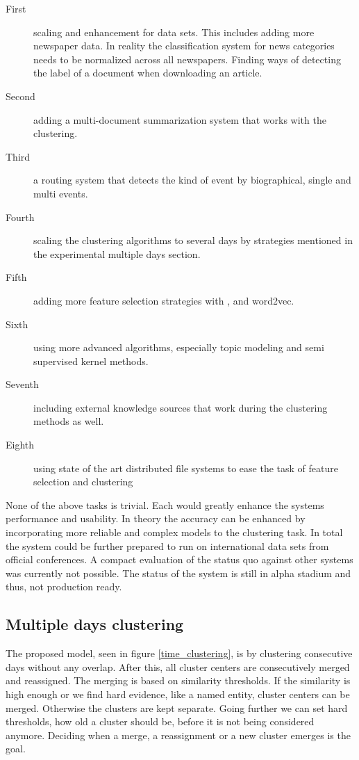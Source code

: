 \begin{description}
  \item[First] scaling and enhancement for data sets. This includes adding more newspaper data. In reality the classification system for news categories needs to be normalized across all newspapers. Finding ways of detecting the label of a document when downloading an article.
  \item[Second] adding a multi-document summarization system that works with the clustering.
  \item[Third] a routing system that detects the kind of event by biographical, single and multi events.
  \item[Fourth] scaling the clustering algorithms to several days by strategies mentioned in the experimental multiple days section.
  \item[Fifth] adding more feature selection strategies with \wordnet{}, \wiki{} and word2vec.
  \item[Sixth] using more advanced algorithms, especially topic modeling and semi supervised kernel methods.
  \item[Seventh] including external knowledge sources that work during the clustering methods as well.
  \item[Eighth] using state of the art distributed file systems to ease the task of feature selection and clustering
\end{description}

None of the above tasks is trivial. Each would greatly enhance the systems performance and usability. In theory the accuracy can be enhanced by incorporating more reliable and complex models to the clustering task. In total the system could be further prepared to run on international data sets from official conferences. A compact evaluation of the status quo against other systems was currently not possible. The status of the system is still in alpha stadium and thus, not production ready.

\subsection*{Multiple days clustering}
  The proposed model, seen in figure \ref{time_clustering}, is by clustering consecutive days without any overlap. After this, all cluster centers are consecutively merged and reassigned. The merging is based on similarity thresholds. If the similarity is high enough or we find hard evidence, like a named entity, cluster centers can be merged. Otherwise the clusters are kept separate. Going further we can set hard thresholds, how old a cluster should be, before it is not being considered anymore. Deciding when a merge, a reassignment or a new cluster emerges is the goal.

